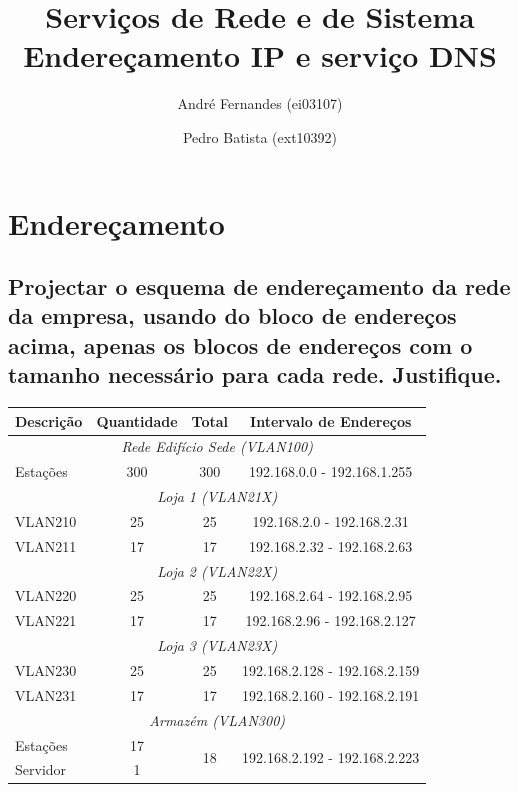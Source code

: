 \documentclass[a4paper,12pt]{article}
\title{Serviços de Rede e de Sistema \\
Endereçamento IP e serviço DNS}
\author{André Fernandes (ei03107) \and Pedro Batista (ext10392)}
\begin{document}
\maketitle

\section{Endereçamento}
\subsection{Projectar o esquema de endereçamento da rede da empresa,
usando do bloco de endereços acima, apenas os blocos de endereços com
o tamanho necessário para cada rede. Justifique.}

\begin{table}[h]
   \centering

   \begin{tabular}{ l | c | c | c }
      \toprule
      \textbf{Descrição} & \textbf{Quantidade} & \textbf{Total} & \textbf{Intervalo de Endereços} \\\hline

      \multicolumn{4}{c}{\textit{Rede Edifício Sede (VLAN100)}} \\ \hline
      Estações & 300 & 300 & 192.168.0.0 - 192.168.1.255 \\ \hline

      \multicolumn{4}{c}{\textit{Loja 1 (VLAN21X)}} \\\hline
      VLAN210 & 25 & 25 & 192.168.2.0 - 192.168.2.31 \\\hline
      VLAN211 & 17 & 17 & 192.168.2.32 - 192.168.2.63 \\\hline

      \multicolumn{4}{c}{\textit{Loja 2 (VLAN22X)}} \\\hline
      VLAN220 & 25 & 25 & 192.168.2.64 - 192.168.2.95 \\\hline
      VLAN221 & 17 & 17 & 192.168.2.96 - 192.168.2.127\\\hline

      \multicolumn{4}{c}{\textit{Loja 3 (VLAN23X)}} \\\hline
      VLAN230 & 25 & 25 & 192.168.2.128 - 192.168.2.159 \\\hline
      VLAN231 & 17 & 17 & 192.168.2.160 - 192.168.2.191 \\\hline

      \multicolumn{4}{c}{\textit{Armazém (VLAN300)}} \\\hline
      Estações & 17 & \multirow{2}{*}{18} & \multirow{2}{*}{192.168.2.192 - 192.168.2.223} \\\cline{1-2}
      Servidor & 1 & \\\hline 


\end{tabular}
\end{table}
\end{document}
